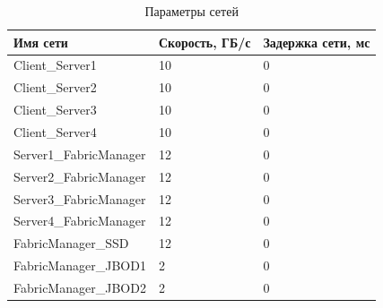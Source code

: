 \begin{table}
\centering
\caption{Параметры сетей}
\label{tab:links}
\begin{tabularx}{\textwidth}{|l|l|l|} 
\hline
Имя сети               & Скорость, ГБ/с & Задержка сети, мс  \\ 
\hline
Client\_Server1        & 10             & 0                  \\ 
\hline
Client\_Server2        & 10             & 0                  \\ 
\hline
Client\_Server3        & 10             & 0                  \\ 
\hline
Client\_Server4        & 10             & 0                  \\ 
\hline
Server1\_FabricManager & 12             & 0                  \\ 
\hline
Server2\_FabricManager & 12             & 0                  \\ 
\hline
Server3\_FabricManager & 12             & 0                  \\ 
\hline
Server4\_FabricManager & 12             & 0                  \\ 
\hline
FabricManager\_SSD     & 12             & 0                  \\ 
\hline
FabricManager\_JBOD1   & 2              & 0                  \\ 
\hline
FabricManager\_JBOD2   & 2              & 0                  \\
\hline
\end{tabularx}
\end{table}
